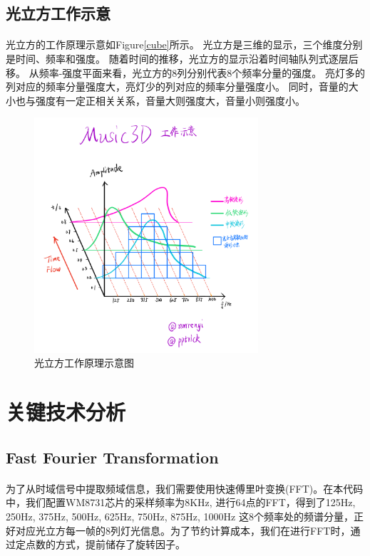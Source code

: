 \documentclass[12pt]{article}
\begin{document}
\subsection{光立方工作示意}
\paragraph{}
光立方的工作原理示意如Figure\eqref{cube}所示。
光立方是三维的显示，三个维度分别是时间、频率和强度。
随着时间的推移，光立方的显示沿着时间轴队列式逐层后移。
从频率-强度平面来看，光立方的8列分别代表8个频率分量的强度。
亮灯多的列对应的频率分量强度大，亮灯少的列对应的频率分量强度小。
同时，音量的大小也与强度有一定正相关关系，音量大则强度大，音量小则强度小。

\begin{figure}[h]
    \centering
    \label{cube}
        \includegraphics[width=0.74\textwidth]{./pic/ProjectWork.png}
        \caption{光立方工作原理示意图}
\end{figure}

\newpage
\section{关键技术分析}
\subsection{Fast Fourier Transformation}
\paragraph{}为了从时域信号中提取频域信息，我们需要使用快速傅里叶变换(FFT)。在本代码中，我们配置WM8731芯片的采样频率为8KHz, 进行64点的FFT，得到了125Hz, 250Hz, 375Hz, 500Hz, 625Hz, 750Hz, 875Hz, 1000Hz
这8个频率处的频谱分量，正好对应光立方每一帧的8列灯光信息。为了节约计算成本，我们在进行FFT时，通过定点数的方式，提前储存了旋转因子。
\end{document}
